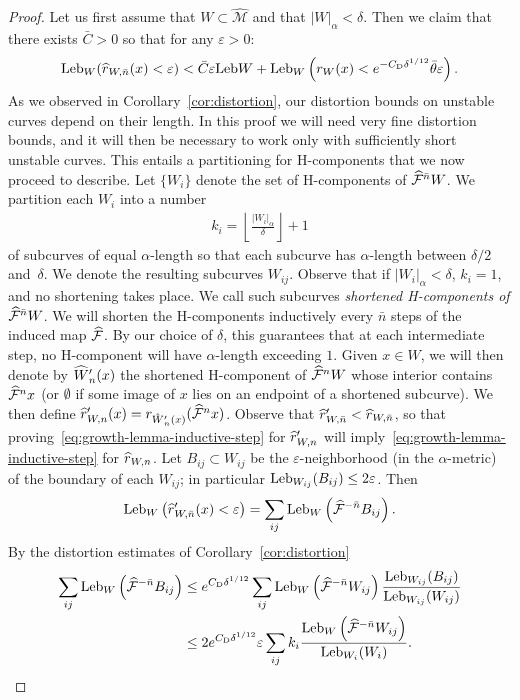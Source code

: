\documentclass[10pt]{amsart}
\theoremstyle{definition}\newtheorem{defi}[theo]{Definition}\newtheorem{rema}[theo]{Remark}\newtheorem{exam}[theo]{Example}\newtheorem{exem}[theo]{Example}\newtheorem{nota}[theo]{Notation}
\newcommand{\eps}{\varepsilon}
\newcommand{\cm}{\mathcal{F}}
\newcommand{\csp}{\mathcal{M}}
\newcommand{\cmp}{\hat\cm}
\newcommand{\cspi}{\widehat{\csp}}
\newcommand{\adm}{_{\alpha^{+}}}
\newcommand{\admName}{\alpha^{+}}
\newcommand{\Leb}{\textup{Leb}}
\newcommand{\Cdist}{C_\mathrm{D}}
\renewcommand{\admName}{\alpha}
\renewcommand{\adm}{_{\alpha}}
\let\oldhat\hat
\renewcommand*{\hat}[1]{\mathchoice{\widehat{#1}}{\widehat{#1}}{\oldhat{#1}}{\oldhat{#1}}}
\begin{document}
\begin{proof}
Let us first assume that $W\subset \cspi$ and that $|W|\adm < \delta$. Then we claim that there exists $\bar C > 0$ so that for any $\eps > 0$:
\begin{align}\label{eq:growth-lemma-inductive-step}
\Leb_{W}(\hat r_{W,\bar n}(x) < \eps) < \bar C\eps\Leb W + \Leb_{W}\left(r_{W}(x) < e^{-\Cdist\delta^{1/12}}\bar\theta\eps\right).
\end{align}
As we observed in Corollary~\ref{cor:distortion}, our distortion bounds on unstable curves depend on their length. In this proof we will need very fine distortion bounds, and it will then be necessary to work only with sufficiently short unstable curves. This entails a partitioning for H-components that we now proceed to describe. Let $\{W_{i}\}$ denote the set of H-components of $\cmp^{\bar n}W$. We partition each $W_{i}$ into a number
\begin{align*}
k_i = \left\lfloor \frac{|W_{i}|\adm}{\delta}\right\rfloor+1
\end{align*}
of subcurves of equal $\admName$-length so that each subcurve has $\admName$-length between $\delta/2$ and~$\delta$. We denote the resulting subcurves $W_{ij}$. Observe that if $|W_{i}|\adm < \delta$, $k_{i} = 1$, and no shortening takes place. We call such subcurves
\emph{shortened H-components of $\cmp^{\bar n}W$}. We will shorten the H-components inductively every $\bar n$ steps of the induced map $\cmp$. By our choice of $\delta$, this guarantees that at each intermediate step, no H-component will have $\admName$-length exceeding $1$. Given $x\in W$, we will then denote by $\hat W'_{n}(x)$ the shortened H-component of $\cmp^{n}W$ whose interior contains $\cmp^{n}x$ (or $\emptyset$ if some image of $x$ lies on an endpoint of a shortened subcurve). We then define $\hat r'_{W,n}(x) = r_{\hat W'_{n}(x)}(\cmp^{n}x)$. Observe that $\hat r'_{W,\bar n} < \hat r_{W,\bar n}$, so that proving~\eqref{eq:growth-lemma-inductive-step} for $\hat r'_{W,n}$ will imply~\eqref{eq:growth-lemma-inductive-step} for $\hat r_{W,n}$. Let $B_{ij}\subset W_{ij}$ be the $\eps$-neighborhood (in the $\admName$-metric) of the boundary of each $W_{ij}$; in particular $\Leb_{W_{ij}}(B_{ij}) \leq 2\eps$. Then
\begin{align*}
\Leb_{W}\left(\hat r'_{W,\bar n}(x) < \eps\right) = \sum_{ij}\Leb_{W}\left(\cmp^{-\bar n}B_{ij}\right).
\end{align*}
By the distortion estimates of Corollary~\ref{cor:distortion}
\begin{align*}
\sum_{ij}\Leb_{W}\left(\cmp^{-\bar n}B_{ij}\right) &\le e^{\Cdist\delta^{1/12}}\sum_{ij}\Leb_{W}\left(\cmp^{-\bar n}W_{ij}\right)
\frac {\Leb_{W_{ij}}(B_{ij})}{\Leb_{W_{ij}}(W_{ij})}\\
& \le 2e^{\Cdist\delta^{1/12}}\eps \sum_{ij} k_{i}\frac{\Leb_{W}\left(\cmp^{-\bar n}W_{ij}\right)}{\Leb_{W_{i}}(W_{i})}.
\end{align*}


\end{proof}
\end{document}
